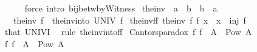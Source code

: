 \begin{isabellebody}
\ \ \ \ \isamarkupfalse%
\isanewline
{}\isamarkupfalse%
\ {\isacharparenleft}{\kern0pt}force\ intro{\isacharcolon}{\kern0pt}\ bij{\isacharunderscore}{\kern0pt}betw{\isacharunderscore}{\kern0pt}byWitness{\isacharparenright}{\kern0pt}%
\endisatagproof
{\isafoldproof}%
%
\isadelimproof
\isanewline
%
\endisadelimproof
\isanewline
{}\isamarkupfalse%
\ the{\isacharunderscore}{\kern0pt}inv\ {\isacharcolon}{\kern0pt}{\isacharcolon}{\kern0pt}\ {\isachardoublequoteopen}{\isacharparenleft}{\kern0pt}{\isacharprime}{\kern0pt}a\ {\isasymRightarrow}\ {\isacharprime}{\kern0pt}b{\isacharparenright}{\kern0pt}\ {\isasymRightarrow}\ {\isacharparenleft}{\kern0pt}{\isacharprime}{\kern0pt}b\ {\isasymRightarrow}\ {\isacharprime}{\kern0pt}a{\isacharparenright}{\kern0pt}{\isachardoublequoteclose}\isanewline
\ \ \ {\isachardoublequoteopen}the{\isacharunderscore}{\kern0pt}inv\ f\ {\isasymequiv}\ the{\isacharunderscore}{\kern0pt}inv{\isacharunderscore}{\kern0pt}into\ UNIV\ f{\isachardoublequoteclose}\isanewline
\isanewline
{}\isamarkupfalse%
\ the{\isacharunderscore}{\kern0pt}inv{\isacharunderscore}{\kern0pt}f{\isacharunderscore}{\kern0pt}f{\isacharcolon}{\kern0pt}\ {\isachardoublequoteopen}the{\isacharunderscore}{\kern0pt}inv\ f\ {\isacharparenleft}{\kern0pt}f\ x{\isacharparenright}{\kern0pt}\ {\isacharequal}{\kern0pt}\ x{\isachardoublequoteclose}\ \ {\isachardoublequoteopen}inj\ f{\isachardoublequoteclose}\isanewline
%
\isadelimproof
\ \ %
\endisadelimproof
%
\isatagproof
{}\isamarkupfalse%
\ that\ UNIV{\isacharunderscore}{\kern0pt}I\ \isamarkupfalse%
\ {\isacharparenleft}{\kern0pt}rule\ the{\isacharunderscore}{\kern0pt}inv{\isacharunderscore}{\kern0pt}into{\isacharunderscore}{\kern0pt}f{\isacharunderscore}{\kern0pt}f{\isacharparenright}{\kern0pt}%
\endisatagproof
{\isafoldproof}%
%
\isadelimproof
%
\endisadelimproof
%
\isadelimdocument
%
\endisadelimdocument
%
\isatagdocument
%
\isamarkuptrue%
%
\endisatagdocument
{\isafolddocument}%
%
\isadelimdocument
%
\endisadelimdocument
{}\isamarkupfalse%
\ Cantors{\isacharunderscore}{\kern0pt}paradox{\isacharcolon}{\kern0pt}\ {\isachardoublequoteopen}{\isasymnexists}f{\isachardot}{\kern0pt}\ f\ {\isacharbackquote}{\kern0pt}\ A\ {\isacharequal}{\kern0pt}\ Pow\ A{\isachardoublequoteclose}\isanewline
%
\isadelimproof
%
\endisadelimproof
%
\isatagproof
{}\isamarkupfalse%
\isanewline
\ \ \isamarkupfalse%
\ {\isachardoublequoteopen}{\isasymexists}f{\isachardot}{\kern0pt}\ f\ {\isacharbackquote}{\kern0pt}\ A\ {\isacharequal}{\kern0pt}\ Pow\ A{\isachardoublequoteclose}\isanewline

\end{isabellebody}
